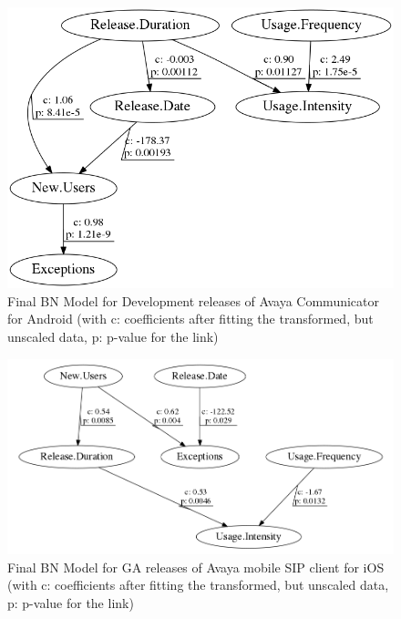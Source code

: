 \documentclass[smallextended]{svjour3}       %
\begin{document}
\begin{figure}[!t]
\centering
\includegraphics[width=\linewidth]{AD}%
\caption{Final BN Model for Development releases of Avaya Communicator for Android (with c: coefficients after fitting the transformed, but unscaled data, p: p-value  for the link) }
\label{fig:finalAD}
\end{figure}

\begin{figure}[!t]
\centering
\includegraphics[width=\linewidth]{i}%
\caption{Final BN Model for GA releases of Avaya mobile SIP client for iOS (with c: coefficients after fitting the transformed, but unscaled data, p: p-value  for the link) }
\label{fig:finalI}
\end{figure}
\end{document}

